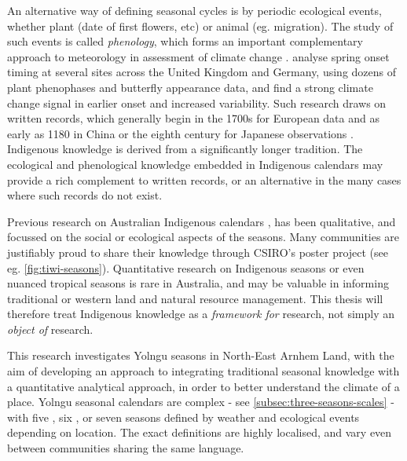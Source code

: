 An alternative way of defining seasonal cycles is by periodic ecological
events, whether plant (date of first flowers, etc) or animal (eg. migration).
The study of such events is called \textit{phenology}, which forms an
important complementary approach to meteorology in assessment of climate
change \citep[eg.][]{roy2000}.  \citet{menzel2006} analyse spring onset timing
at several sites across the United Kingdom and Germany, using dozens of
plant phenophases and butterfly appearance data, and find a strong climate
change signal in earlier onset and increased variability.  Such research
draws on written records, which generally begin in the 1700s for European
data and as early as 1180 in China \citep[][p97]{yoshino1996} or the eighth century
for Japanese observations \citep{sparks2002}.
%
Indigenous knowledge is derived from a significantly longer
tradition.  The ecological and phenological knowledge embedded
in Indigenous calendars may provide a rich complement to written records,
or an alternative in the many cases where such records do not exist.


Previous research on Australian Indigenous calendars ,
\citep{CSIROcals,clarke2009,davis1989,atlas2014}
has been qualitative, and focussed on the social or ecological aspects of
the seasons.  Many communities are justifiably proud to share
their knowledge through CSIRO's poster project (see eg. \cref{fig:tiwi-seasons}).
Quantitative research on Indigenous seasons or even nuanced tropical seasons
is rare in Australia, and may be valuable in informing traditional or western
land and natural resource management.  This thesis will therefore treat
Indigenous knowledge as a \emph{framework for} research, not simply an
\emph{object of} research.


This research investigates Yolngu seasons in North-East Arnhem Land, with the
aim of developing an approach to integrating traditional seasonal knowledge
with a quantitative analytical approach, in order to better understand the climate
of a place.  Yolngu seasonal calendars are complex - see
\cref{subsec:three-seasons-scales} - with five \citep{davis1989}, six
\citep{atlas2014}, or seven \citep{barber2005} seasons defined by weather and
ecological events depending on location.  The exact definitions are highly localised,
and vary even between communities sharing the same language.

